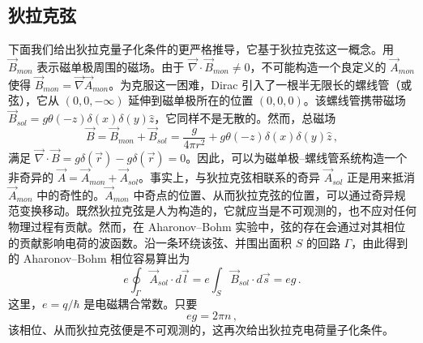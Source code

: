 
\subsection{狄拉克弦}

下面我们给出狄拉克量子化条件的更严格推导，它基于狄拉克弦这一概念。用 $\vec{B}_{mon}$ 表示磁单极周围的磁场。由于 $\vec{\nabla}\cdot\vec{B}_{mon}\ne 0$，不可能构造一个良定义的 $\vec{A}_{mon}$ 使得
$\vec{B}_{mon}=\vec{\nabla} \vec{A}_{mon}$。为克服这一困难，Dirac 引入了一根半无限长的螺线管（或弦），它从 $(0,0,-\infty)$ 延伸到磁单极所在的位置 $(0,0,0)$。该螺线管携带磁场 $\vec{B}_{sol}=g\theta (-z)\delta(x)
\delta(y)\hat{z}$，它同样不是无散的。然而，总磁场
\begin{equation}
\vec{B}=\vec{B}_{mon}+\vec{B}_{sol}=\frac{g}{4\pi r^{2}}+g\theta(-z)
\delta(x)\delta(y)\hat{z}\,,
\end{equation}
满足 $\vec{\nabla}\cdot\vec{B}=g\delta(\vec{r})-g\delta(\vec{r}) 
=0$。因此，可以为磁单极–螺线管系统构造一个非奇异的 $\vec{A}=
\vec{A}_{mon}+\vec{A}_{sol}$。事实上，与狄拉克弦相联系的奇异 $\vec{A}_{sol}$ 正是用来抵消 $\vec{A}_{mon}$ 中的奇性的。$\vec{A}_{mon}$ 中奇点的位置、从而狄拉克弦的位置，可以通过奇异规范变换移动。既然狄拉克弦是人为构造的，它就应当是不可观测的，也不应对任何物理过程有贡献。然而，在 Aharonov–Bohm 实验中，弦的存在会通过对其相位的贡献影响电荷的波函数。沿一条环绕该弦、并围出面积 $S$ 的回路 $\Gamma$，由此得到的 Aharonov–Bohm 相位容易算出为
$$
e \oint_{\Gamma} \vec{A}_{sol} \cdot d \vec{l} = e \int_S
\vec{B}_{sol} \cdot d\vec{s} = e g\,.
$$
这里，$e=q/\hbar$ 是电磁耦合常数。只要
$$
e g = 2\pi n\,,
$$
该相位、从而狄拉克弦便是不可观测的，这再次给出狄拉克电荷量子化条件。



